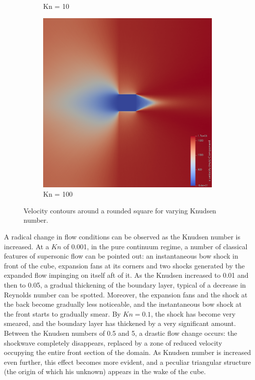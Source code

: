 \begin{figure}
\begin{subfigure}{0.32\textwidth}
        \caption{Kn = 10}
    \end{subfigure}
    \hfill
    \begin{subfigure}{0.32\textwidth}
        \centering
        \includegraphics[width=\textwidth]{Images/4. Results/Square Kn/pv/Kn100.png}
        \caption{Kn = 100}
    \end{subfigure}
    \caption{Velocity contours around a rounded square for varying Knudsen number.}
    \label{fig:vcontoursquare}
\end{figure}

A radical change in flow conditions can be observed as the Knudsen number is increased. At a $Kn$ of 0.001, in the pure continuum regime, a number of classical features of supersonic flow can be pointed out: an instantaneous bow shock in front of the cube, expansion fans at its corners and two shocks generated by the expanded flow impinging on itself aft of it. As the Knudsen increased to 0.01 and then to 0.05, a gradual thickening of the boundary layer, typical of a decrease in Reynolds number can be spotted. Moreover, the expansion fans and the shock at the back become gradually less noticeable, and the instantaneous bow shock at the front starts to gradually smear. By $Kn = 0.1$, the shock has become very smeared, and the boundary layer has thickened by a very significant amount. Between the Knudsen numbers of 0.5 and 5, a drastic flow change occurs: the shockwave completely disappears, replaced by a zone of reduced velocity occupying the entire front section of the domain. As Knudsen number is increased even further, this effect becomes more evident, and a peculiar triangular structure (the origin of which his unknown)  appears in the wake of the cube.

